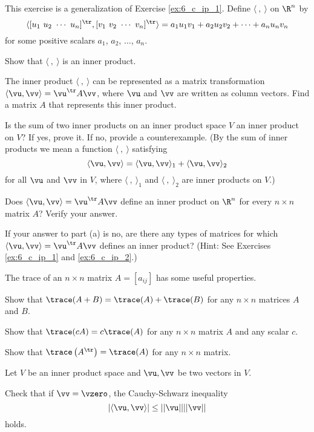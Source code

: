 \item \label{ex:6_c_ip_2} This exercise is a generalization of Exercise \ref{ex:6_c_ip_1}. Define $\langle \ ,  \ \rangle$ on $\R^n$ by 
\[\langle [u_1 \ u_2 \ \cdots \ u_n]^{\tr},  [v_1 \ v_2 \ \cdots \ v_n]^{\tr} \rangle = a_1u_1v_1+a_2u_2v_2+ \cdots + a_nu_nv_n\]
for some positive scalars $a_1$, $a_2$, $\ldots$, $a_n$. 
	\ba
	\item Show that $\langle \ ,  \ \rangle$ is an inner product.
	\item The inner product $\langle \ ,  \ \rangle$ can be represented as a matrix transformation $\langle \vu, \vv \rangle = \vu^{\tr} A \vv$, where $\vu$ and $\vv$ are written as column vectors. Find a matrix $A$ that represents this inner product. 
	\ea

\item Is the sum of two inner products on an inner product space $V$ an inner product on $V$? If yes, prove it. If no, provide a counterexample. (By the sum of inner products we mean a function $\langle \ , \ \rangle$ satisfying 
	\[\langle \vu, \vv \rangle = \langle \vu, \vv \rangle_1 + \langle \vu, \vv \rangle_2\]
for all $\vu$ and $\vv$ in $V$, where $\langle \ , \ \rangle_1$ and $\langle \ , \ \rangle_2$ are inner products on $V$.) 

\item 
	\ba
	\item Does $\langle \vu, \vv \rangle = \vu^{\tr}A\vv$ define an inner product on $\R^n$ for every $n \times n$ matrix $A$? Verify your answer.  
	\item If your answer to part (a) is no, are there any types of matrices for which $\langle \vu, \vv \rangle = \vu^{\tr}A\vv$ defines an inner product? (Hint: See Exercises \ref{ex:6_c_ip_1} and \ref{ex:6_c_ip_2}.)
	\ea

\item \label{ex:6_c_trace} The trace of an $n \times n$ matrix $A = [a_{ij}]$ has some useful properties. 
	\ba
	\item Show that $\trace(A+B) = \trace(A) + \trace(B)$ for any $n \times n$ matrices $A$ and $B$.
	\item Show that $\trace(cA) = c \trace(A)$ for any $n \times n$ matrix $A$ and any scalar $c$. 
	\item Show that $\trace\left(A^{\tr}\right) = \trace(A)$ for any $n \times n$ matrix.
	\ea

\item Let $V$ be an inner product space and $\vu, \vv$ be two vectors in $V$. 
\ba 
\item Check that if $\vv=\vzero$, the Cauchy-Schwarz inequality 
\[ |\langle \vu, \vv \rangle | \leq ||\vu || ||\vv || \]
holds.

